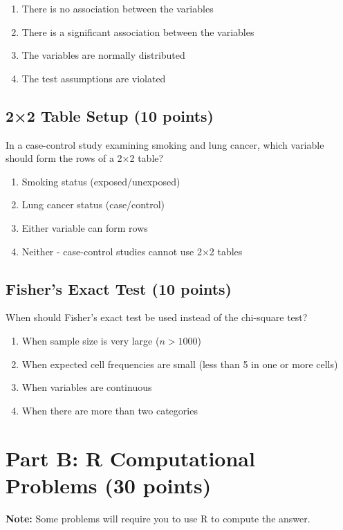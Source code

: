 \documentclass[11pt]{article}
\begin{document}
\begin{enumerate}[label=\Alph*.]
\item There is no association between the variables
\item There is a significant association between the variables
\item The variables are normally distributed
\item The test assumptions are violated
\end{enumerate}

\subsection*{2×2 Table Setup (10 points)}
In a case-control study examining smoking and lung cancer, which variable should form the rows of a 2×2 table?

\begin{enumerate}[label=\Alph*.]
\item Smoking status (exposed/unexposed)
\item Lung cancer status (case/control)
\item Either variable can form rows
\item Neither - case-control studies cannot use 2×2 tables
\end{enumerate}

\subsection*{Fisher's Exact Test (10 points)}
When should Fisher's exact test be used instead of the chi-square test?

\begin{enumerate}[label=\Alph*.]
\item When sample size is very large ($n > 1000$)
\item When expected cell frequencies are small (less than 5 in one or more cells)
\item When variables are continuous
\item When there are more than two categories
\end{enumerate}

\newpage

\section{Part B: R Computational Problems (30 points)}

\textbf{Note:} Some problems will require you to use R to compute the answer.
\end{document}
